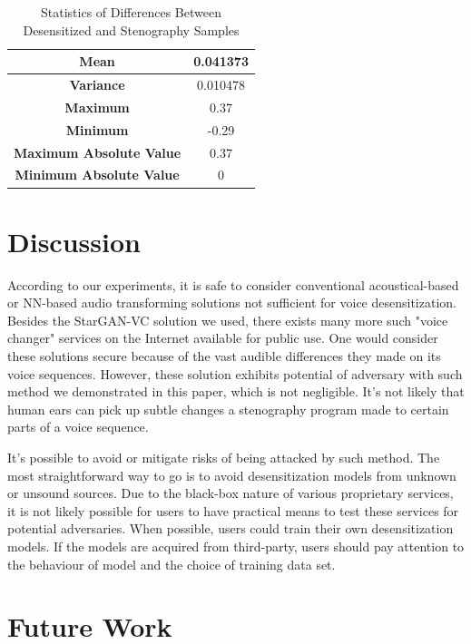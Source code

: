 \documentclass[journal]{IEEEtran} %
\begin{document}
\begin{CJK*}{UTF8}{gbsn}
\begin{table}[htbp]
    \centering
    \caption{Statistics of Differences Between Desensitized and Stenography Samples}
    \begin{tabular}{|c|c|}
        \hline
        \textbf{Mean} & 0.041373 \\
        \hline
        \textbf{Variance} & 0.010478 \\
        \hline
        \textbf{Maximum} & 0.37 \\
        \hline
        \textbf{Minimum} & -0.29 \\
        \hline
        \textbf{Maximum Absolute Value} & 0.37 \\
        \hline
        \textbf{Minimum Absolute Value} & 0 \\
        \hline
    \end{tabular}
\end{table}

\section{Discussion}

According to our experiments, it is safe to consider conventional acoustical-based or NN-based audio transforming solutions not sufficient for voice desensitization. Besides the StarGAN-VC solution we used, there exists many more such "voice changer" services on the Internet available for public use. One would consider these solutions secure because of the vast audible differences they made on its voice sequences. However, these solution exhibits potential of adversary with such method we demonstrated in this paper, which is not negligible. It's not likely that human ears can pick up subtle changes a stenography program made to certain parts of a voice sequence.

It's possible to avoid or mitigate risks of being attacked by such method. The most straightforward way to go is to avoid desensitization models from unknown or unsound sources. Due to the black-box nature of various proprietary services, it is not likely possible for users to have practical means to test these services for potential adversaries. When possible, users could train their own desensitization models. If the models are acquired from third-party, users should pay attention to the behaviour of model and the choice of training data set.

\section{Future Work}


\end{CJK*}
\end{document}
